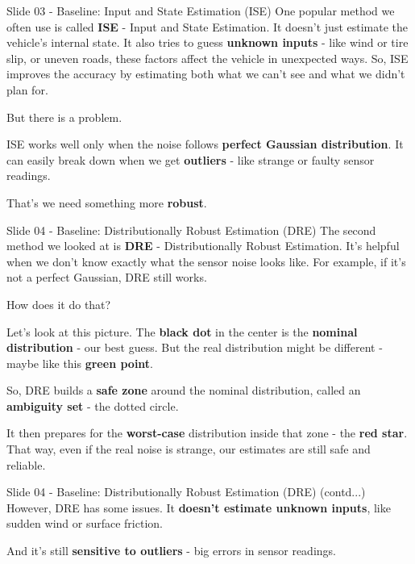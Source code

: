 \documentclass{beamer}
\begin{document}
\begin{frame}{Slide 03 - Baseline: Input and State Estimation (ISE)}
\protect\hypertarget{slide-03---baseline-input-and-state-estimation-ise}{}
One popular method we often use is called \textbf{ISE} - Input and State
Estimation. It doesn't just estimate the vehicle's internal state. It
also tries to guess \textbf{unknown inputs} - like wind or tire slip, or
uneven roads, these factors affect the vehicle in unexpected ways. So,
ISE improves the accuracy by estimating both what we can't see and what
we didn't plan for.

But there is a problem.

ISE works well only when the noise follows \textbf{perfect Gaussian
distribution}. It can easily break down when we get \textbf{outliers} -
like strange or faulty sensor readings.

That's we need something more \textbf{robust}.
\end{frame}

\begin{frame}{Slide 04 - Baseline: Distributionally Robust Estimation
(DRE)}
\protect\hypertarget{slide-04---baseline-distributionally-robust-estimation-dre}{}
The second method we looked at is \textbf{DRE} - Distributionally Robust
Estimation. It's helpful when we don't know exactly what the sensor
noise looks like. For example, if it's not a perfect Gaussian, DRE still
works.

How does it do that?

Let's look at this picture. The \textbf{black dot} in the center is the
\textbf{nominal distribution} - our best guess. But the real
distribution might be different - maybe like this \textbf{green point}.

So, DRE builds a \textbf{safe zone} around the nominal distribution,
called an \textbf{ambiguity set} - the dotted circle.

It then prepares for the \textbf{worst-case} distribution inside that
zone - the \textbf{red star}. That way, even if the real noise is
strange, our estimates are still safe and reliable.
\end{frame}

\begin{frame}{Slide 04 - Baseline: Distributionally Robust Estimation
(DRE) (contd...)}
However, DRE has some issues. It \textbf{doesn't estimate unknown
inputs}, like sudden wind or surface friction.

And it's still \textbf{sensitive to outliers} - big errors in sensor
readings.
\end{frame}
\end{document}
